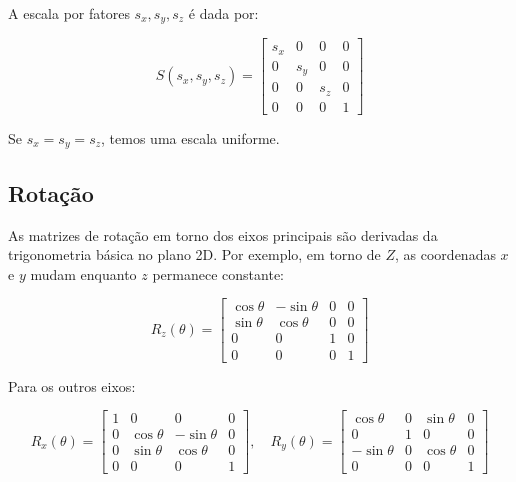 A escala por fatores $s_x, s_y, s_z$ é dada por:

\begin{equation}
    S(s_x, s_y, s_z) = \begin{bmatrix}
    s_x & 0 & 0 & 0 \\
    0 & s_y & 0 & 0 \\
    0 & 0 & s_z & 0 \\
    0 & 0 & 0 & 1
    \end{bmatrix}
\end{equation}

Se $s_x = s_y = s_z$, temos uma escala uniforme.

\subsection{Rotação}

As matrizes de rotação em torno dos eixos principais são derivadas da trigonometria básica no plano 2D. Por exemplo, em torno de $Z$, as coordenadas $x$ e $y$ mudam enquanto $z$ permanece constante:

\begin{equation}
    R_z(\theta) = \begin{bmatrix}
    \cos\theta & -\sin\theta & 0 & 0 \\
    \sin\theta & \cos\theta & 0 & 0 \\
    0 & 0 & 1 & 0 \\
    0 & 0 & 0 & 1
    \end{bmatrix}
\end{equation}

Para os outros eixos:

\begin{equation}
    R_x(\theta) = \begin{bmatrix}
    1 & 0 & 0 & 0 \\
    0 & \cos\theta & -\sin\theta & 0 \\
    0 & \sin\theta & \cos\theta & 0 \\
    0 & 0 & 0 & 1
    \end{bmatrix}, \quad
    R_y(\theta) = \begin{bmatrix}
    \cos\theta & 0 & \sin\theta & 0 \\
    0 & 1 & 0 & 0 \\
    -\sin\theta & 0 & \cos\theta & 0 \\
    0 & 0 & 0 & 1
    \end{bmatrix}
\end{equation}


